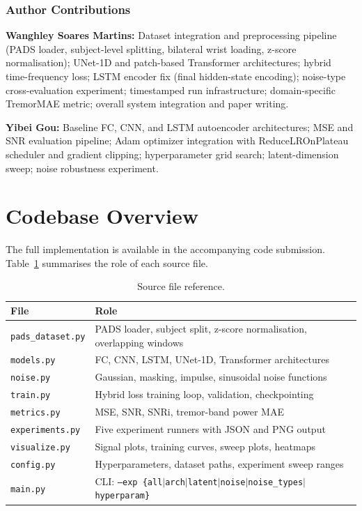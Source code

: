 \documentclass{article}
\begin{document}
\subsubsection*{Author Contributions}

\textbf{Wanghley Soares Martins:}
Dataset integration and preprocessing pipeline (PADS loader, subject-level
splitting, bilateral wrist loading, z-score normalisation);
UNet-1D and patch-based Transformer architectures;
hybrid time-frequency loss; LSTM encoder fix (final hidden-state encoding);
noise-type cross-evaluation experiment; timestamped run infrastructure;
domain-specific TremorMAE metric; overall system integration and paper writing.

\textbf{Yibei Gou:}
Baseline FC, CNN, and LSTM autoencoder architectures;
MSE and SNR evaluation pipeline; Adam optimizer integration with
ReduceLROnPlateau scheduler and gradient clipping;
hyperparameter grid search; latent-dimension sweep; noise robustness experiment.




\appendix

\section{Codebase Overview}
\label{app:code}

The full implementation is available in the accompanying code submission.
Table~\ref{tab:code} summarises the role of each source file.

\begin{table}[ht]
\caption{Source file reference.}
\label{tab:code}
\begin{center}
\begin{tabular}{ll}
\toprule
\textbf{File} & \textbf{Role} \\
\midrule
\texttt{pads\_dataset.py} & PADS loader, subject split, z-score normalisation,
  overlapping windows \\
\texttt{models.py} & FC, CNN, LSTM, UNet-1D, Transformer architectures \\
\texttt{noise.py} & Gaussian, masking, impulse, sinusoidal noise functions \\
\texttt{train.py} & Hybrid loss training loop, validation, checkpointing \\
\texttt{metrics.py} & MSE, SNR, SNRi, tremor-band power MAE \\
\texttt{experiments.py} & Five experiment runners with JSON and PNG output \\
\texttt{visualize.py} & Signal plots, training curves, sweep plots, heatmaps \\
\texttt{config.py} & Hyperparameters, dataset paths, experiment sweep ranges \\
\texttt{main.py} & CLI:
  \texttt{--exp \{all$|$arch$|$latent$|$noise$|$noise\_types$|$hyperparam\}} \\
\bottomrule
\end{tabular}
\end{center}
\end{table}
\end{document}
